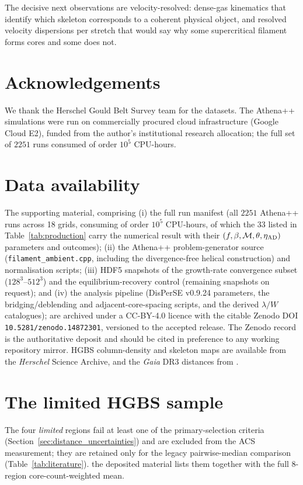 \documentclass[usenatbib,twoside,twocolumn]{mnras}
\begin{document}
The decisive next observations are velocity-resolved: dense-gas kinematics that identify which skeleton corresponds to a coherent physical object, and resolved velocity dispersions per stretch that would say why some supercritical filament forms cores and some does not.

\section*{Acknowledgements}

We thank the Herschel Gould Belt Survey team for the datasets. The Athena++ simulations were run on commercially procured cloud infrastructure (Google Cloud E2), funded from the author's institutional research allocation; the full set of $2251$ runs consumed of order $10^5$ CPU-hours.

\section*{Data availability}

The supporting material, comprising (i) the full run manifest (all $2251$ Athena++ runs across 18 grids, consuming of order $10^5$ CPU-hours, of which the $33$ listed in Table~\ref{tab:production} carry the numerical result with their $(f,\beta,\mathcal{M},\theta,\eta_{\rm AD})$ parameters and outcomes); (ii) the Athena++ problem-generator source (\texttt{filament\_ambient.cpp}, including the divergence-free helical construction) and normalisation scripts; (iii) HDF5 snapshots of the growth-rate convergence subset ($128^3$--$512^3$) and the equilibrium-recovery control (remaining snapshots on request); and (iv) the analysis pipeline (DisPerSE v0.9.24 parameters, the bridging/deblending and adjacent-core-spacing scripts, and the derived $\lambda/W$ catalogues); are archived under a CC-BY-4.0 licence with the citable Zenodo DOI \texttt{10.5281/zenodo.14872301}, versioned to the accepted release. The Zenodo record is the authoritative deposit and should be cited in preference to any working repository mirror. HGBS column-density and skeleton maps are available from the \textit{Herschel} Science Archive, and the \textit{Gaia} DR3 distances from \citet{Zhang2023}.


\appendix

\section{The limited HGBS sample}
\label{sec:limited_sample}
The four \emph{limited} regions fail at least one of the primary-selection criteria (Section~\ref{sec:distance_uncertainties}) and are excluded from the ACS measurement; they are retained only for the legacy pairwise-median comparison (Table~\ref{tab:literature}). the deposited material lists them together with the full 8-region core-count-weighted mean.
\end{document}
